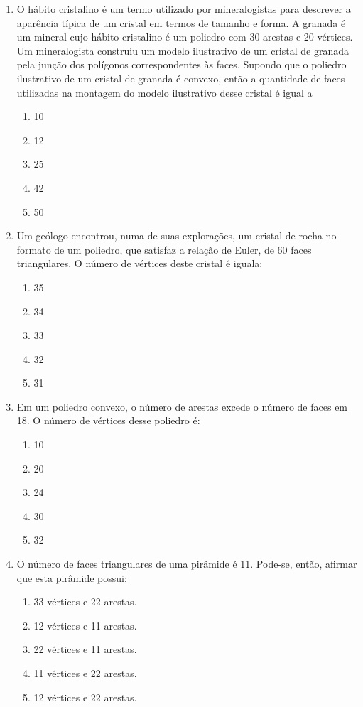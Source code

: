 \documentclass[oneside,a4paper,12pt]{article}
\begin{document}
\begin{enumerate}
\item O hábito cristalino é um termo utilizado por mineralogistas para descrever a aparência típica de um cristal em termos de tamanho e forma. A granada é um mineral cujo hábito cristalino é um poliedro com 30 arestas e 20 vértices. Um mineralogista construiu um modelo ilustrativo de um cristal de granada pela junção dos polígonos correspondentes às faces. Supondo que o poliedro ilustrativo de um cristal de granada é convexo, então a quantidade de faces utilizadas na montagem do modelo ilustrativo desse cristal é igual a
\begin{enumerate}
\item 10
\item 12
\item 25
\item 42
\item 50
\end{enumerate}

\item Um geólogo encontrou, numa de suas explorações, um cristal de rocha no formato de um poliedro, que satisfaz a relação de Euler, de 60 faces triangulares. O número de vértices deste cristal é iguala:
\begin{enumerate}
\item 35
\item 34
\item 33
\item 32
\item 31
\end{enumerate}


\item Em um poliedro convexo, o número de arestas excede o número de faces em 18. O número de vértices desse poliedro é:
\begin{enumerate}
\item 10
\item 20
\item 24
\item 30
\item 32
\end{enumerate}

\item O número de faces triangulares de uma pirâmide é 11. Pode-se, então, afirmar que esta pirâmide possui:
\begin{enumerate}
\item 33 vértices e 22 arestas.
\item 12 vértices e 11 arestas.
\item 22 vértices e 11 arestas.
\item 11 vértices e 22 arestas.
\item 12 vértices e 22 arestas.
\end{enumerate}


\end{enumerate}
\end{document}
